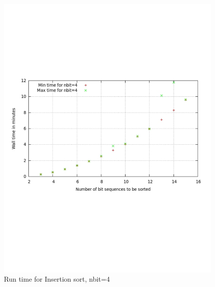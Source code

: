 \documentclass[12pt]{article}
\begin{document}
\begin{figure}
\centering
\includegraphics[width=12cm]{fsort3.pdf} 
\caption{Run time for Insertion sort, nbit=4} 
\label{fig:image_sf3} %
\end{figure}
\end{document}
